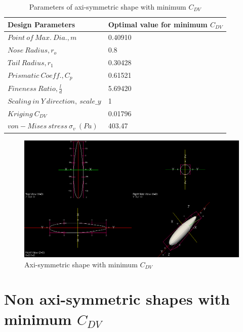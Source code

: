 \begin{table}[H]
	\centering
	\caption{Parameters of axi-symmetric shape with minimum $ C_{DV}$}
	\label{optimal solution obtained}
	\begin{tabular}{ll}
		\hline \hline
		Design Parameters & Optimal value for minimum $ C_{DV} $    \\ \hline \hline
		
		$ Point\ of\ Max.\ Dia., m$ & 0.40910      \\  
		$ Nose\ Radius, r _{o} $ & 0.8    \\
		$ Tail\ Radius, r _{1} $ & 0.30428     \\  
		$ Prismatic\ Coeff., C _{p }$ & 0.61521 \\
		$ Fineness\ Ratio, \frac{l}{d} $ &5.69420 \\
		$Scaling\ in\ Y\ direction,\ scale\_y$ & 1 \\
		\hline \hline
		
		$ Kriging\ C_{DV} $ & 0.01796 \\
		$ von-Mises\ stress\ \sigma _{v}\ (Pa) $ & 403.47 \\ \hline \hline
	\end{tabular}
\end{table}

\begin{figure}[H]
	\centering
	\includegraphics[width=450 pt]{rnd/min_cdv_case1.png}
	\caption{Axi-symmetric shape with minimum $ C_{DV}$}
	\label{Optimal min cdv case 1} %
\end{figure}


\section{Non axi-symmetric shapes with minimum $ C_{DV}$}
